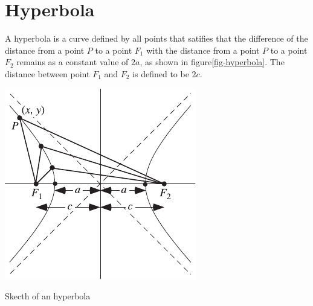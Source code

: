 \documentclass[../main-notes.tex]{subfiles}
\begin{document}
\section{Hyperbola}

A hyperbola is a curve defined by all points that satifies that the difference of the distance from a point $P$ to a point $F_1$ with the distance from a point $P$ to a point $F_2$ remains as a constant value of $2a$, as shown in figure\ref{fig-hyperbola}.
The distance between point $F_1$ and $F_2$ is defined to be $2c$.

\begin{marginfigure}
    \centering
    \includegraphics[width=\textwidth]{../Figures/hyperbola/HyperbolaFoci_750.pdf}
    \caption{Skecth of an hyperbola}\label{fig-hyperbola}
\end{marginfigure}
\end{document}
